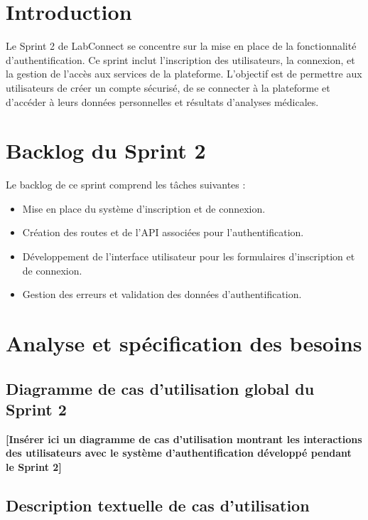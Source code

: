 \documentclass[12pt,a4paper]{report}
\begin{document}
\section{Introduction}

Le Sprint 2 de LabConnect se concentre sur la mise en place de la fonctionnalité d'authentification. Ce sprint inclut l'inscription des utilisateurs, la connexion, et la gestion de l'accès aux services de la plateforme. L'objectif est de permettre aux utilisateurs de créer un compte sécurisé, de se connecter à la plateforme et d'accéder à leurs données personnelles et résultats d'analyses médicales.

\section{Backlog du Sprint 2}

Le backlog de ce sprint comprend les tâches suivantes :

\begin{itemize}
    \item Mise en place du système d'inscription et de connexion.
    \item Création des routes et de l’API associées pour l’authentification.
    \item Développement de l’interface utilisateur pour les formulaires d’inscription et de connexion.
    \item Gestion des erreurs et validation des données d’authentification.
\end{itemize}

\section{Analyse et spécification des besoins}

\subsection{Diagramme de cas d’utilisation global du Sprint 2}

\textbf{[Insérer ici un diagramme de cas d’utilisation montrant les interactions des utilisateurs avec le système d’authentification développé pendant le Sprint 2]}

\subsection{Description textuelle de cas d’utilisation}
\end{document}
